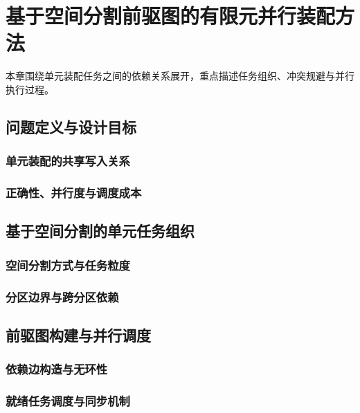 \chapter{基于空间分割前驱图的有限元并行装配方法}
\label{chap:assembly}

本章围绕单元装配任务之间的依赖关系展开，重点描述任务组织、冲突规避与并行执行过程。

\section{问题定义与设计目标}
\subsection{单元装配的共享写入关系}
\thesisdraftnote

\subsection{正确性、并行度与调度成本}
\thesisdraftnote

\section{基于空间分割的单元任务组织}
\subsection{空间分割方式与任务粒度}
\thesisdraftnote

\subsection{分区边界与跨分区依赖}
\thesisdraftnote

\section{前驱图构建与并行调度}
\subsection{依赖边构造与无环性}
\thesisdraftnote

\subsection{就绪任务调度与同步机制}
\thesisdraftnote

